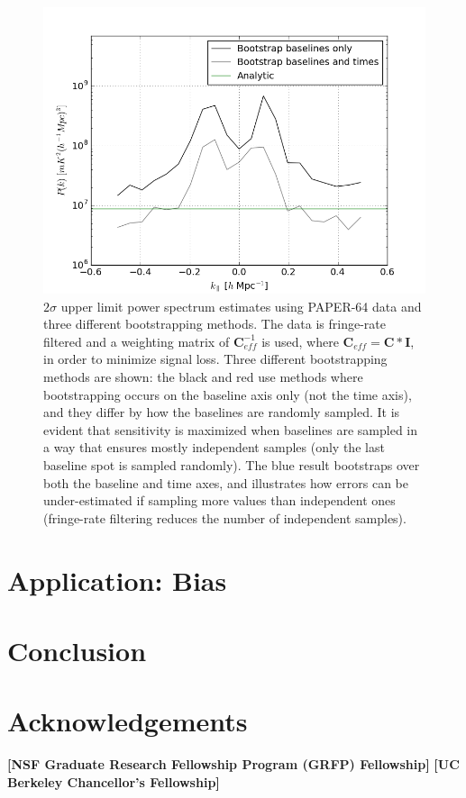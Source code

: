\documentclass[preprint2,numberedappendix,tighten,twocolappendix]{aastex6}  %
\newcommand{\cc}[1]{{\color{purple} \textbf{[#1]}}}
\begin{document}
\begin{figure}
	\centering
	\includegraphics[width=\columnwidth]{plots/data_errors.png}
	\caption{$2\sigma$ upper limit power spectrum estimates using PAPER-64 data and three different bootstrapping methods. The data is fringe-rate filtered and a weighting matrix of $\textbf{C}_{eff}^{-1}$ is used, where $\textbf{C}_{eff} = \textbf{C}*\textbf{I}$, in order to minimize signal loss. Three different bootstrapping methods are shown: the black and red use methods where bootstrapping occurs on the baseline axis only (not the time axis), and they differ by how the baselines are randomly sampled. It is evident that sensitivity is maximized when baselines are sampled in a way that ensures mostly independent samples (only the last baseline spot is sampled randomly). The blue result bootstraps over both the baseline and time axes, and illustrates how errors can be under-estimated if sampling more values than independent ones (fringe-rate filtering reduces the number of independent samples).}
	\label{fig:data_errors}
\end{figure}

\section{Application: Bias}
\label{sec:Bias}


\section{Conclusion}
\label{sec:Con}

\section{Acknowledgements}
\cc{NSF Graduate Research Fellowship Program (GRFP) Fellowship}
\cc{UC Berkeley Chancellor's Fellowship}
\label{sec:Ack}



\end{document}
